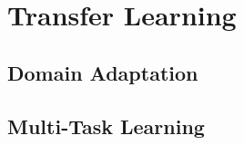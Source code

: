 \section{Transfer Learning}
\label{transfer_learning}

\subsection{Domain Adaptation}
\subsection{Multi-Task Learning}